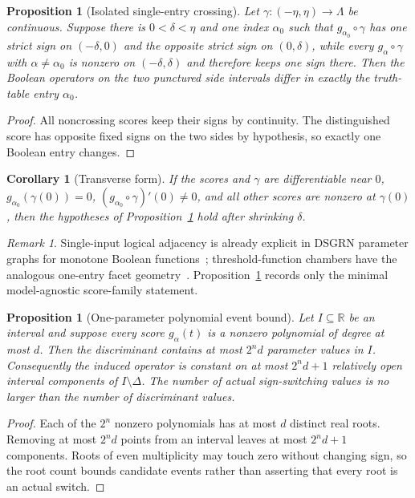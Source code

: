 \documentclass[11pt]{article}
\newtheorem{proposition}[theorem]{Proposition}
\newtheorem{corollary}[theorem]{Corollary}
\theoremstyle{definition}
\theoremstyle{remark}
\newtheorem{remark}[theorem]{Remark}
\newcommand{\R}{\mathbb{R}}
\newcommand{\Deltaop}{\Delta}
\begin{document}
\begin{proposition}[Isolated single-entry crossing]\label{prop:oneentry}
Let $\gamma:(-\eta,\eta)\to\Lambda$ be continuous. Suppose there is $0<\delta<\eta$ and one index $\alpha_0$ such that $g_{\alpha_0}\circ\gamma$ has one strict sign on $(-\delta,0)$ and the opposite strict sign on $(0,\delta)$, while every $g_\alpha\circ\gamma$ with $\alpha\ne\alpha_0$ is nonzero on $(-\delta,\delta)$ and therefore keeps one sign there. Then the Boolean operators on the two punctured side intervals differ in exactly the truth-table entry $\alpha_0$.
\end{proposition}

\begin{proof}
All noncrossing scores keep their signs by continuity. The distinguished score has opposite fixed signs on the two sides by hypothesis, so exactly one Boolean entry changes.
\end{proof}

\begin{corollary}[Transverse form]
If the scores and $\gamma$ are differentiable near $0$, $g_{\alpha_0}(\gamma(0))=0$, $(g_{\alpha_0}\circ\gamma)'(0)\ne0$, and all other scores are nonzero at $\gamma(0)$, then the hypotheses of Proposition~\ref{prop:oneentry} hold after shrinking $\delta$.
\end{corollary}

\begin{remark}
Single-input logical adjacency is already explicit in DSGRN parameter graphs for monotone Boolean functions~\cite{CrawfordKahrlEtAl2022}; threshold-function chambers have the analogous one-entry facet geometry~\cite{Anthony2026}. Proposition~\ref{prop:oneentry} records only the minimal model-agnostic score-family statement.
\end{remark}

\begin{proposition}[One-parameter polynomial event bound]\label{prop:polybound}
Let $I\subseteq\R$ be an interval and suppose every score $g_\alpha(t)$ is a nonzero polynomial of degree at most $d$. Then the discriminant contains at most $2^n d$ parameter values in $I$. Consequently the induced operator is constant on at most $2^n d+1$ relatively open interval components of $I\setminus\Deltaop$. The number of actual sign-switching values is no larger than the number of discriminant values.
\end{proposition}

\begin{proof}
Each of the $2^n$ nonzero polynomials has at most $d$ distinct real roots. Removing at most $2^n d$ points from an interval leaves at most $2^n d+1$ components. Roots of even multiplicity may touch zero without changing sign, so the root count bounds candidate events rather than asserting that every root is an actual switch.
\end{proof}
\end{document}

